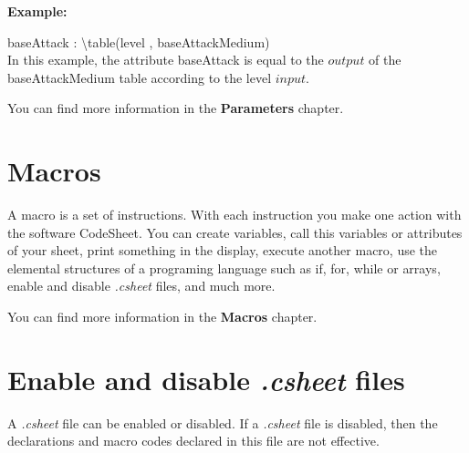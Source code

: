 \documentclass[11pt,a4paper,openright,oneside]{book}
\newenvironment{ex}
{
  \setlength{\parindent}{0cm}
  \large \textbf{Example:} \normalsize 
}
{}
\begin{document}
\begin{ex}
  \textsf{baseAttack : \textbackslash table(level , baseAttackMedium)} \\
  In this example, the attribute \textsf{baseAttack} is equal to the $output$ of the \textsf{baseAttackMedium} table according to the \textsf{level} $input$.
\end{ex}

You can find more information in the \textbf{Parameters} chapter.

\section{Macros}
A macro is a set of instructions. With each instruction you make one action with the software \textsf{CodeSheet}. You can create variables, call this variables or attributes of your sheet, print something in the display, execute another macro, use the elemental structures of a programing language such as \textsf{if, for, while} or \textsf{arrays}, enable and disable \textit{.csheet} files, and much more.

You can find more information in the \textbf{Macros} chapter.

\section{Enable and disable \textit{.csheet} files}

A \textit{.csheet} file can be enabled or disabled. If a \textit{.csheet} file is disabled, then the declarations and macro codes declared in this file are not effective.
\end{document}
